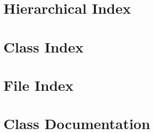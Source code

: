 \documentclass[twoside]{book}
\newcommand{\+}{\discretionary{\mbox{\scriptsize$\hookleftarrow$}}{}{}}
\begin{document}
\chapter{Hierarchical Index}

\chapter{Class Index}

\chapter{File Index}

\chapter{Class Documentation}





















\end{document}
